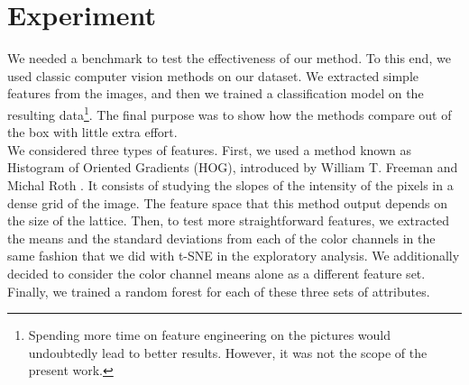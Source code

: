 \section{Experiment}

We needed a benchmark to test the effectiveness of our method. To this end, we used classic computer vision methods on our dataset. We extracted simple features from the images, and then we trained a classification model on the resulting data\footnote{Spending more time on feature engineering on the pictures would undoubtedly lead to better results. However, it was not the scope of the present work.}. The final purpose was to show how the methods compare out of the box with little extra effort.\\

We considered three types of features. First, we used a method known as Histogram of Oriented Gradients (HOG), introduced by William T. Freeman and Michal Roth \cite{MERL_TR94-03}. It consists of studying the slopes of the intensity of the pixels in a dense grid of the image. The feature space that this method output depends on the size of the lattice. Then, to test more straightforward features, we extracted the means and the standard deviations from each of the color channels in the same fashion that we did with t-SNE in the exploratory analysis. We additionally decided to consider the color channel means alone as a different feature set. Finally, we trained a random forest for each of these three sets of attributes.\\


